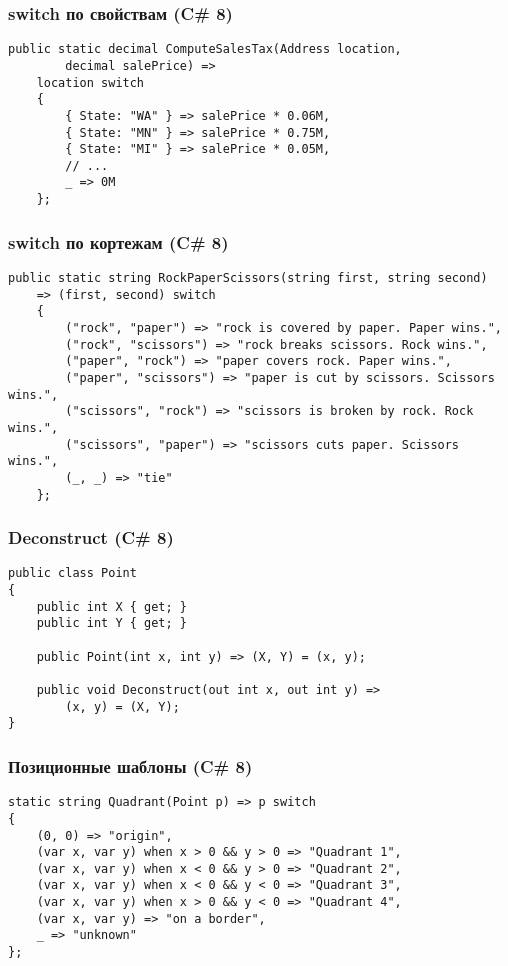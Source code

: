 \documentclass[xetex,mathserif,serif]{beamer}
\begin{document}
	\begin{frame}[fragile]
		\frametitle{switch по свойствам (C\# 8)}
		\begin{verbatim}
public static decimal ComputeSalesTax(Address location, 
        decimal salePrice) =>
    location switch
    {
        { State: "WA" } => salePrice * 0.06M,
        { State: "MN" } => salePrice * 0.75M,
        { State: "MI" } => salePrice * 0.05M,
        // ...
        _ => 0M
    };
		\end{verbatim}
	\end{frame}

	\begin{frame}[fragile]
		\frametitle{switch по кортежам (C\# 8)}
		\begin{verbatim}
public static string RockPaperScissors(string first, string second)
    => (first, second) switch
    {
        ("rock", "paper") => "rock is covered by paper. Paper wins.",
        ("rock", "scissors") => "rock breaks scissors. Rock wins.",
        ("paper", "rock") => "paper covers rock. Paper wins.",
        ("paper", "scissors") => "paper is cut by scissors. Scissors wins.",
        ("scissors", "rock") => "scissors is broken by rock. Rock wins.",
        ("scissors", "paper") => "scissors cuts paper. Scissors wins.",
        (_, _) => "tie"
    };
		\end{verbatim}
	\end{frame}

	\begin{frame}[fragile]
		\frametitle{Deconstruct (C\# 8)}
		\begin{verbatim}
public class Point
{
    public int X { get; }
    public int Y { get; }

    public Point(int x, int y) => (X, Y) = (x, y);

    public void Deconstruct(out int x, out int y) =>
        (x, y) = (X, Y);
}
		\end{verbatim}
	\end{frame}

	\begin{frame}[fragile]
		\frametitle{Позиционные шаблоны (C\# 8)}
		\begin{verbatim}
static string Quadrant(Point p) => p switch
{
    (0, 0) => "origin",
    (var x, var y) when x > 0 && y > 0 => "Quadrant 1",
    (var x, var y) when x < 0 && y > 0 => "Quadrant 2",
    (var x, var y) when x < 0 && y < 0 => "Quadrant 3",
    (var x, var y) when x > 0 && y < 0 => "Quadrant 4",
    (var x, var y) => "on a border",
    _ => "unknown"
};
		\end{verbatim}
	\end{frame}
\end{document}
